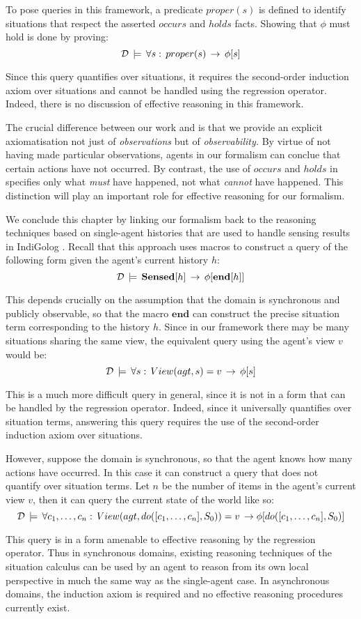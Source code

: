 To pose queries in this framework, a predicate $proper(s)$ is defined
to identify situations that respect the asserted $occurs$ and $holds$
facts. Showing that $\phi$ must hold is done by proving:\[
\mathcal{D}\,\models\,\forall s:\, proper(s)\,\rightarrow\,\phi[s]\]


Since this query quantifies over situations, it requires the second-order
induction axiom over situations and cannot be handled using the regression
operator. Indeed, there is no discussion of effective reasoning in
this framework.

The crucial difference between our work and \citep{pinto98sc_observations}
is that we provide an explicit axiomatisation not just of \emph{observations}
but of \emph{observability.} By virtue of not having made particular
observations, agents in our formalism can conclue that certain actions
have not occurred. By contrast, the use of $occurs$ and $holds$
in \citep{pinto98sc_observations} specifies only what \emph{must}
have happened, not what \emph{cannot} have happened. This distinction
will play an important role for effective reasoning for our formalism.

We conclude this chapter by linking our formalism back to the reasoning
techniques based on single-agent histories that are used to handle
sensing results in IndiGolog \citep{giacomo99indigolog}. Recall that
this approach uses macros to construct a query of the following form
given the agent's current history $h$:\[
\mathcal{D}\,\models\,\mathbf{Sensed}[h]\,\rightarrow\,\phi[\mathbf{end}[h]]\]


This depends crucially on the assumption that the domain is synchronous
and publicly observable, so that the macro $\mathbf{end}$ can construct
the precise situation term corresponding to the history $h$. Since
in our framework there may be many situations sharing the same view,
the equivalent query using the agent's view $v$ would be:\[
\mathcal{D}\,\models\,\forall s:\, View(agt,s)=v\,\rightarrow\,\phi[s]\]


This is a much more difficult query in general, since it is not in
a form that can be handled by the regression operator. Indeed, since
it universally quantifies over situation terms, answering this query
requires the use of the second-order induction axiom over situations.

However, suppose the domain is synchronous, so that the agent knows
how many actions have occurred. In this case it can construct a query
that does not quantify over situation terms. Let $n$ be the number
of items in the agent's current view $v$, then it can query the current
state of the world like so:\[
\mathcal{D}\,\models\,\forall c_{1},\dots,c_{n}:\, View(agt,do([c_{1},\dots,c_{n}],S_{0}))=v\,\rightarrow\phi[do([c_{1},\dots,c_{n}],S_{0})]\]


This query is in a form amenable to effective reasoning by the regression
operator. Thus in synchronous domains, existing reasoning techniques
of the situation calculus can be used by an agent to reason from its
own local perspective in much the same way as the single-agent case.
In asynchronous domains, the induction axiom is required and no effective
reasoning procedures currently exist.

